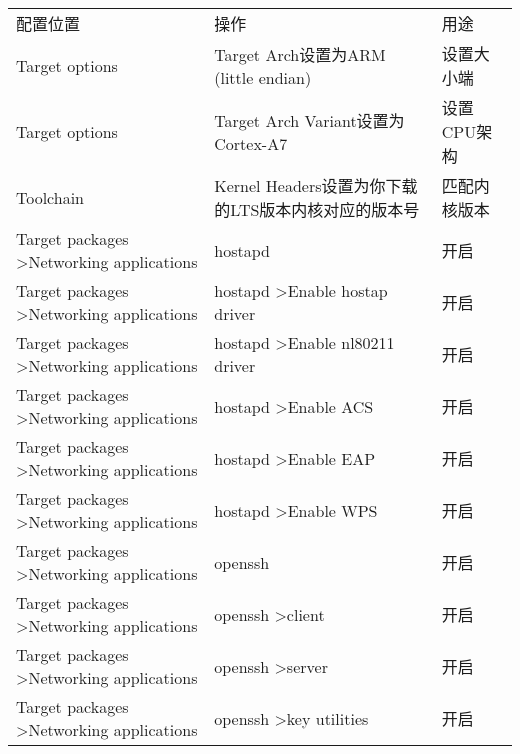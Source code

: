 \documentclass[lang=cn,newtx,10pt,scheme=chinese]{elegantbook}
\begin{document}
\begin{table}[]
\begin{tabular}{lll}
配置位置                                                       & 操作                                                 & 用途                        \\
Target options                                             & Target Arch设置为ARM (little endian)                  & 设置大小端                     \\
Target options                                             & Target Arch Variant设置为Cortex-A7                    & 设置CPU架构                   \\
Toolchain                                                  & Kernel Headers设置为你下载的LTS版本内核对应的版本号                 & 匹配内核版本                    \\
Target packages \textgreater Networking applications       & hostapd                                            & 开启                        \\
Target packages \textgreater Networking applications       & hostapd \textgreater Enable hostap driver          & 开启                        \\
Target packages \textgreater Networking applications       & hostapd \textgreater Enable nl80211 driver         & 开启                        \\
Target packages \textgreater Networking applications       & hostapd \textgreater Enable ACS                    & 开启                        \\
Target packages \textgreater Networking applications       & hostapd \textgreater Enable EAP                    & 开启                        \\
Target packages \textgreater Networking applications       & hostapd \textgreater Enable WPS                    & 开启                        \\
Target packages \textgreater Networking applications       & openssh                                            & 开启                        \\
Target packages \textgreater Networking applications       & openssh \textgreater client                        & 开启                        \\
Target packages \textgreater Networking applications       & openssh \textgreater server                        & 开启                        \\
Target packages \textgreater Networking applications       & openssh \textgreater key utilities                 & 开启                        \\

\end{tabular}
\end{table}
\end{document}
